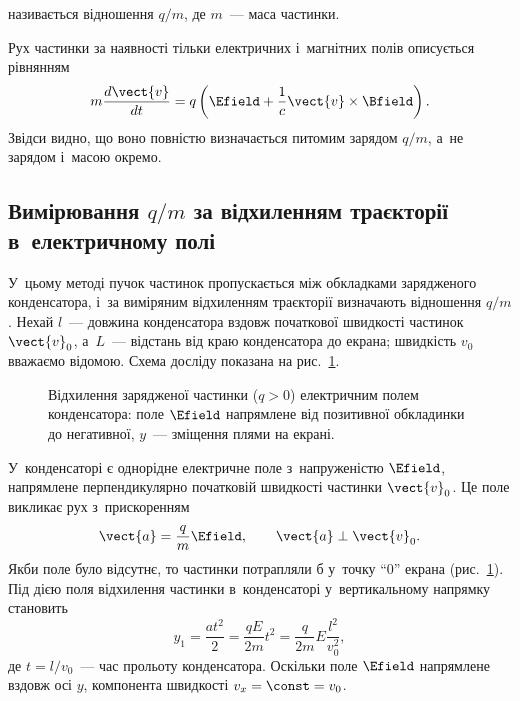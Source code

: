  називається відношення $q/m$, де $m$~--- маса частинки.

Рух частинки за наявності тільки електричних і~магнітних полів описується рівнянням
\begin{equation}\label{eq:q_m_motion}
	m\frac{d\vect{v}}{dt} = q\left(\Efield + \frac{1}{c}\vect{v} \times \Bfield\right).
\end{equation}
Звідси видно, що воно повністю визначається питомим зарядом $q/m$, а~не зарядом і~масою окремо.


\subsection*{Вимірювання $q/m$ за відхиленням траєкторії в~електричному полі}


У~цьому методі пучок частинок пропускається між обкладками зарядженого конденсатора, і~за виміряним відхиленням траєкторії визначають відношення $q/m$. Нехай $l$~--- довжина конденсатора вздовж початкової швидкості частинок $\vect{v}_0$, а~$L$~--- відстань від краю конденсатора до екрана; швидкість $v_0$ вважаємо відомою. Схема досліду показана на рис.~\ref{tikz:condenser_deflection}.

\begin{figure}[h!]
	\centering
	\caption{Відхилення зарядженої частинки ($q>0$) електричним полем конденсатора: поле $\Efield$ напрямлене від позитивної обкладинки до негативної, $y$~--- зміщення плями на екрані.}
	\label{tikz:condenser_deflection}
\end{figure}

У~конденсаторі є однорідне електричне поле з~напруженістю $\Efield$, напрямлене перпендикулярно початковій швидкості частинки $\vect{v}_0$. Це поле викликає рух з~прискоренням
\begin{equation}\label{eq:a_E}
	\vect{a} = \frac{q}{m}\Efield, \qquad \vect{a} \perp \vect{v}_0.
\end{equation}
Якби поле було відсутнє, то частинки потрапляли б у~точку \enquote{0} екрана (рис.~\ref{tikz:condenser_deflection}). Під дією поля відхилення частинки в~конденсаторі у~вертикальному напрямку становить
\begin{equation}\label{eq:y1_E}
	y_1 = \frac{at^2}{2} = \frac{qE}{2m}t^2 = \frac{q}{2m}E\frac{l^2}{v_0^2},
\end{equation}
де $t = l/v_0$~--- час прольоту конденсатора. Оскільки поле $\Efield$ напрямлене вздовж осі $y$, компонента швидкості $v_x = \const = v_0$.

